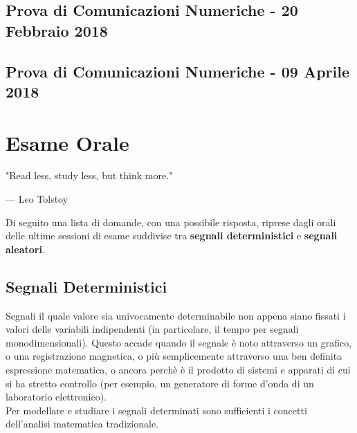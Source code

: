\documentclass[12pt,oneside,openany]{memoir}
\numberwithin{equation}{subsection}
\begin{document}
\section{Prova di Comunicazioni Numeriche - 20 Febbraio 2018}


\section{Prova di Comunicazioni Numeriche - 09 Aprile 2018}


\chapter{Esame Orale}
\epigraph{
	"Read less, study less, but think more."
}{--- \textup{Leo Tolstoy}}

Di seguito una lista di domande, con una possibile risposta, riprese dagli orali
delle ultime sessioni di esame suddivise tra \textbf{segnali deterministici} e
\textbf{segnali aleatori}.


\section{Segnali Deterministici}
Segnali il quale valore sia univocamente determinabile non appena siano fissati
i valori delle variabili indipendenti (in particolare, il tempo per segnali
monodimensionali). Questo accade quando il segnale \`e noto attraverso un
grafico, o una registrazione magnetica, o pi\`u semplicemente attraverso una ben
definita espressione matematica, o ancora perch\`e \`e il prodotto di sistemi e
apparati di cui si ha stretto controllo (per esempio, un generatore di forme
d'onda di un laboratorio elettronico).\\
Per modellare e studiare i segnali determinati sono sufficienti i concetti
dell'analisi matematica tradizionale.
\end{document}
